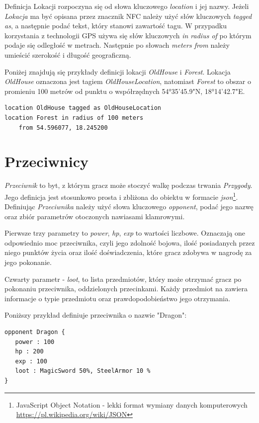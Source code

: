 \documentclass[openright]{xmgr}
\begin{document}
Definicja Lokacji rozpoczyna się od słowa kluczowego \textit{location} i jej nazwy. Jeżeli \textit{Lokacja} ma być opisana przez znacznik NFC należy użyć słów kluczowych \textit{tagged as}, a następnie podać tekst, który stanowi zawartość tagu. W przypadku korzystania z technologii GPS używa się słów kluczowych \textit{in radius of} po którym podaje się odległość w metrach. Następnie po słowach \textit{meters from} należy umieścić szerokość i długość geograficzną.

Poniżej znajdują się przykłady definicji lokacji \textit{OldHouse} i \textit{Forest}. Lokacja \textit{OldHouse} oznaczona jest tagiem \textit{OldHouseLocation}, natomiast \textit{Forest} to obszar o promieniu 100 metrów od punktu o współrzędnych 54°35'45.9"N, 18°14'42.7"E.
\begin{verbatim}
location OldHouse tagged as OldHouseLocation
location Forest in radius of 100 meters 
	from 54.596077, 18.245200
\end{verbatim}

\section{Przeciwnicy}

\textit{Przeciwnik} to byt, z którym gracz może stoczyć walkę podczas trwania \textit{Przygody}. Jego definicja jest stosunkowo prosta i zbliżona do obiektu w formacie \textit{json}\footnote{JavaScript Object Notation - lekki format wymiany danych komputerowych \url{https://pl.wikipedia.org/wiki/JSON}}. Definiując \textit{Przeciwnika} należy użyć słowa kluczowego \textit{opponent}, podać jego nazwę oraz zbiór parametrów otoczonych nawiasami klamrowymi.

Pierwsze trzy parametry to \textit{power}, \textit{hp}, \textit{exp} to wartości liczbowe. Oznaczają one odpowiednio moc przeciwnika, czyli jego zdolność bojowa, ilość posiadanych przez niego punktów życia oraz ilość doświadczenia, które gracz zdobywa w nagrodę za jego pokonanie.

Czwarty parametr - \textit{loot}, to lista przedmiotów, który może otrzymać gracz po pokonaniu przeciwnika, oddzielonych przecinkami. Każdy przedmiot na zawiera informacje o typie przedmiotu oraz prawdopodobieństwo jego otrzymania.

Poniższy przykład definiuje przeciwnika o nazwie "Dragon":

\begin{verbatim}
opponent Dragon {
   power : 100
   hp : 200
   exp : 100
   loot : MagicSword 50%, SteelArmor 10 %
}
\end{verbatim}
\end{document}
